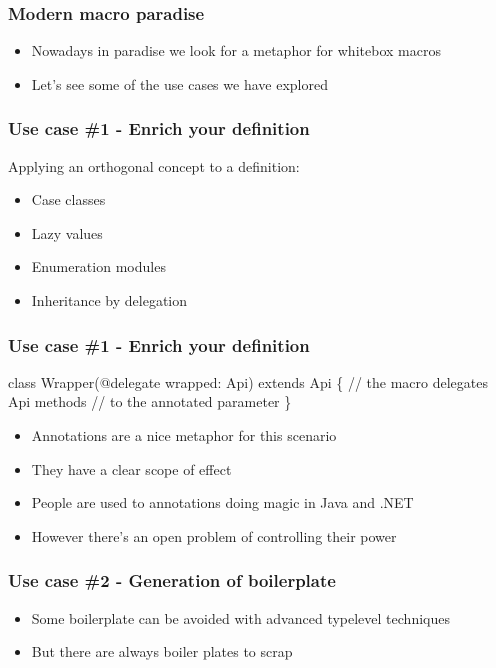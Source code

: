 \documentclass[svgnames,hyperref={bookmarks=false}]{beamer}
\begin{document}
\begin{frame}[fragile]
\frametitle{Modern macro paradise}

\begin{itemize}
\item Nowadays in paradise we look for a metaphor for whitebox macros
\item Let's see some of the use cases we have explored
\end{itemize}
\end{frame}

\begin{frame}[fragile]
\frametitle{Use case \#1 - Enrich your definition}

Applying an orthogonal concept to a definition:
\begin{itemize}
\item Case classes
\item Lazy values
\item Enumeration modules
\item Inheritance by delegation
\end{itemize}
\end{frame}

\begin{frame}[fragile]
\frametitle{Use case \#1 - Enrich your definition}

\begin{semiverbatim}
class Wrapper(\alert{@delegate} wrapped: Api) extends Api \{
  // the macro delegates Api methods
  // to the annotated parameter
\}

\end{semiverbatim}

\begin{itemize}
\item Annotations are a nice metaphor for this scenario
\item They have a clear scope of effect
\item People are used to annotations doing magic in Java and .NET
\item However there's an open problem of controlling their power
\end{itemize}
\end{frame}

\begin{frame}[fragile]
\frametitle{Use case \#2 - Generation of boilerplate}

\begin{itemize}
\item Some boilerplate can be avoided with advanced typelevel techniques
\item But there are always boiler plates to scrap
\end{itemize}
\end{frame}
\end{document}
